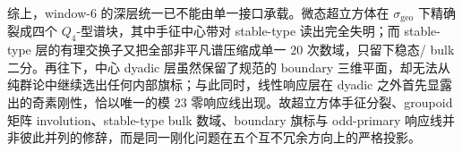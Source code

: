 \noindent
综上，window-\(6\) 的深层统一已不能由单一接口承载。微态超立方体在 \(\sigma_{\mathrm{geo}}\) 下精确裂成四个 \(Q_4\)-型谱块，其中手征中心带对 stable-type 读出完全失明；而 stable-type 层的有理交换子又把全部非平凡谱压缩成单一 \(20\) 次数域，只留下稳态/ bulk 二分。再往下，中心 dyadic 层虽然保留了规范的 boundary 三维平面，却无法从纯群论中继续选出任何内部旗标；与此同时，线性响应层在 dyadic 之外首先显露出的奇素刚性，恰以唯一的模 \(23\) 零响应线出现。故超立方体手征分裂、groupoid 矩阵 involution、stable-type bulk 数域、boundary 旗标与 odd-primary 响应线并非彼此并列的修辞，而是同一刚化问题在五个互不冗余方向上的严格投影。
\endinput
